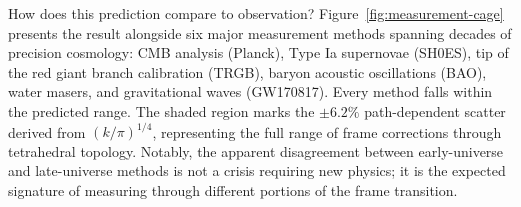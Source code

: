 \documentclass[aps,prd,preprint,superscriptaddress,showpacs,preprintnumbers,amsmath,amssymb,nofootinbib]{revtex4-2}
\begin{document}
\vspace{1cm}

How does this prediction compare to observation? Figure~\ref{fig:measurement-cage} presents the result alongside six major measurement methods spanning decades of precision cosmology: CMB analysis (Planck), Type Ia supernovae (SH0ES), tip of the red giant branch calibration (TRGB), baryon acoustic oscillations (BAO), water masers, and gravitational waves (GW170817). Every method falls within the predicted range. The shaded region marks the $\pm 6.2\%$ path-dependent scatter derived from $(k/\pi)^{1/4}$, representing the full range of frame corrections through tetrahedral topology. Notably, the apparent disagreement between early-universe and late-universe methods is not a crisis requiring new physics; it is the expected signature of measuring through different portions of the frame transition.

\vspace{0.8em}
\end{document}
